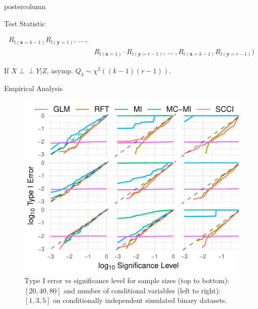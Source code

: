 \documentclass{beamer}
\def\ci{\perp\!\!\!\!\!\perp}
\begin{document}
\begin{frame}
\begin{columns}
\begin{column}{.33\textwidth}
\begin{beamercolorbox}[center]{postercolumn}
\begin{minipage}{.98\textwidth}
{\begin{myblock}{Test Statistic}
\begin{itemize}
\begin{equation*}
\begin{split}
										R_{\mathbb{I}(\mathbf{x}=k-1)} R_{\mathbb{I}(\mathbf{y}=1)}, \, \ldots \, , \\
								     &R_{\mathbb{I}(\mathbf{x}=1)} \cdot R_{\mathbb{I}(\mathbf{y}=r-1)}, \, \ldots \ ,
										R_{\mathbb{I}(\mathbf{x}=k-1)} R_{\mathbb{I}(\mathbf{y}=r-1)}) 
								\end{split}
							\end{equation*}
							
							If $ X \ci Y | Z $, asymp. $ Q_3 \sim \chi^2((k-1)(r-1)) $.
						\end{itemize}

					\end{myblock}\vfill
					\begin{myblock}{Empirical Analysis}
						\begin{figure}
							\centering
							\includegraphics[scale=3]{../in_person/imgs/calibration_add_vars.pdf}
							\caption{Type I error vs significance level for sample sizes (top to
							bottom): $ [20, 40, 80] $ and number of conditional variables (left to
							right): $ [1, 3, 5] $ on conditionally independent simulated binary
							datasets.}
							\label{fig:calibration}
						\end{figure}
						\begin{figure}
							\centering

\end{figure}
\end{myblock}}
\end{minipage}
\end{beamercolorbox}
\end{column}
\end{columns}
\end{frame}
\end{document}
